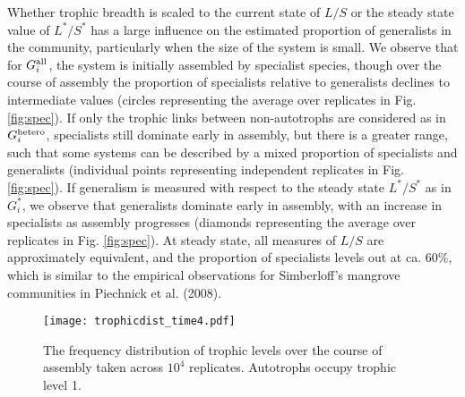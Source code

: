 \documentclass[twocolumn,preprintnumbers,amsmath,amssymb,superscriptaddress]{revtex4}
\newcommand{\rr}[1]{{\rm #1}}
\begin{document}
Whether trophic breadth is scaled to the current state of $L/S$ or the steady state value of $L^*/S^*$ has a large influence on the estimated proportion of generalists in the community, particularly when the size of the system is small.
We observe that for $G_i^{\rr{all}}$, the system is initially assembled by specialist species, though over the course of assembly the proportion of specialists relative to generalists declines to intermediate values (circles representing the average over replicates in Fig. \ref{fig:spec}).
If only the trophic links between non-autotrophs are considered as in $G_i^{\rr{hetero}}$, specialists still dominate early in assembly, but there is a greater range, such that some systems can be described by a mixed proportion of specialists and generalists (individual points representing independent replicates in Fig. \ref{fig:spec}).
If generalism is measured with respect to the steady state $L^*/S^*$ as in $G_i^*$, we observe that generalists dominate early in assembly, with an increase in specialists as assembly progresses (diamonds representing the average over replicates in Fig. \ref{fig:spec}).
At steady state, all measures of $L/S$ are approximately equivalent, and the proportion of specialists levels out at ca. 60\%, which is similar to the empirical observations for Simberloff's mangrove communities in Piechnick et al. (2008).




\begin{figure}
\centering
\texttt{[image: trophicdist\_time4.pdf]}
\caption{
The frequency distribution of trophic levels over the course of assembly taken across $10^4$ replicates. Autotrophs occupy trophic level 1.
}
\label{fig:trophic}
\end{figure} 
\end{document}
